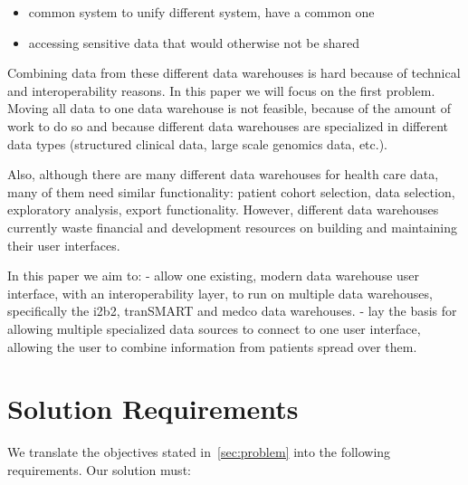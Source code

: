 \begin{itemize}
    \item common system to unify different system, have a common one
    \item accessing sensitive data that would otherwise not be shared
\end{itemize}



Combining data from these different data warehouses is hard because of technical and interoperability reasons. In this paper we will focus on the first problem. Moving all data to one data warehouse is not feasible, because of the amount of work to do so and because different data warehouses are specialized in different data types (structured clinical data, large scale genomics data, etc.).

Also, although there are many different data warehouses for health care data, many of them need similar functionality: patient cohort selection, data selection, exploratory analysis, export functionality. However, different data warehouses currently waste financial and development resources on building and maintaining their user interfaces.

In this paper we aim to:
- allow one existing, modern data warehouse user interface, with an interoperability layer, to run on multiple data warehouses, specifically the i2b2, tranSMART and medco data warehouses.
- lay the basis for allowing multiple specialized data sources to connect to one user interface, allowing the user to combine information from patients spread over them.


\section{Solution Requirements}
\label{sec:requirements}

We translate the objectives stated in~\ref{sec:problem} into the following requirements.
Our solution must:

